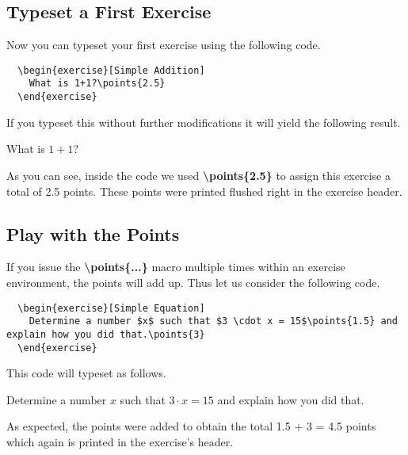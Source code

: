 \documentclass[
  twocolumn,%
  fontsize=9pt,%
  DIV=calc,%
  numbers=noendperiod%
]{scrartcl}
\begin{document}
\subsection{Typeset a First Exercise}
Now you can typeset your first exercise using the following code.

\begin{lstlisting}
  \begin{exercise}[Simple Addition]
    What is 1+1?\points{2.5}
  \end{exercise}
\end{lstlisting}

\noindent If you typeset this without further modifications it will yield the following result.

\begin{exercise}
  What is $1+1$?
\end{exercise} 

\noindent As you can see, inside the code we used \textcolor{NavyBlue}{\ttfamily\bfseries \textbackslash points\{2.5\}} to assign this exercise a total of 2.5 points. These points were printed flushed right in the exercise header.

\subsection{Play with the Points}
If you issue the  \textcolor{NavyBlue}{\ttfamily\bfseries \textbackslash points\{...\}} macro multiple times within an exercise environment, the points will add up. Thus let us consider the following code.

\begin{lstlisting}
  \begin{exercise}[Simple Equation]
    Determine a number $x$ such that $3 \cdot x = 15$\points{1.5} and explain how you did that.\points{3}
  \end{exercise} 
\end{lstlisting}

\noindent This code will typeset as follows.

\begin{exercise}
  Determine a number $x$ such that $3 \cdot x = 15$ and explain how you did that.
\end{exercise}

\noindent As expected, the points were added to obtain the total 1.5 + 3 = 4.5 points which again is printed in the exercise's header. 
\end{document}
